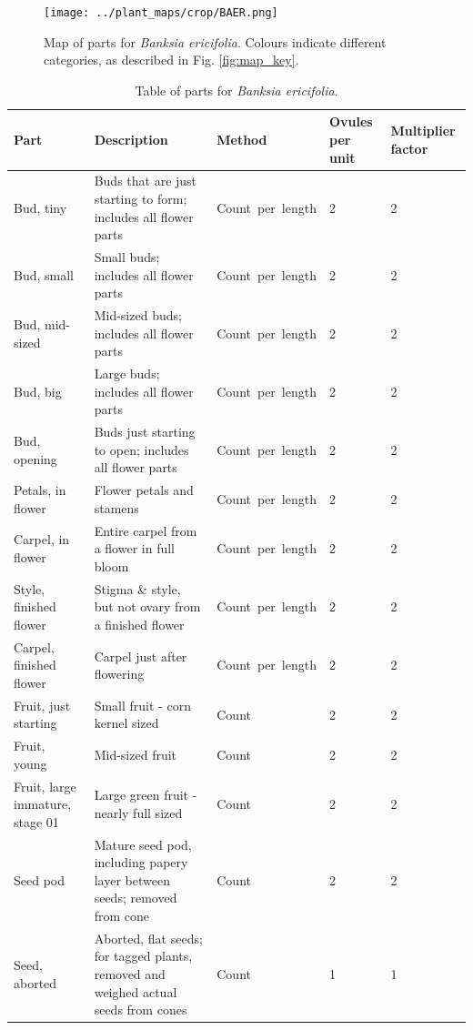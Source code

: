 \documentclass[10pt,twoside]{article}\usepackage[]{graphicx}\usepackage[]{color}
\begin{document}
\begin{figure}[h]
\centering
\texttt{[image: ../plant\_maps/crop/BAER.png]}
\caption{Map of parts for \emph{Banksia ericifolia}. Colours indicate different categories, as described in Fig. \ref{fig:map_key}.}
\label{fig:map_Banksia_ericifolia}
\end{figure}

\clearpage
\begingroup\small
\begin{longtable}{p{4.5cm}p{6cm}p{2cm}p{1cm}p{1cm}}
\caption{Table of parts for \emph{Banksia ericifolia}.} \\ 
  \hline
Part & Description & Method & Ovules per unit & Multiplier factor \\ 
  \hline
Bud, tiny & Buds that are just starting to form; includes all flower parts & Count\ per\ length & 2 &   2 \\ 
  Bud, small & Small buds; includes all flower parts & Count\ per\ length & 2 &   2 \\ 
  Bud, mid-sized & Mid-sized buds; includes all flower parts & Count\ per\ length & 2 &   2 \\ 
  Bud, big & Large buds; includes all flower parts & Count\ per\ length & 2 &   2 \\ 
  Bud, opening & Buds just starting to open; includes all flower parts & Count\ per\ length & 2 &   2 \\ 
  Petals, in flower & Flower petals and stamens & Count\ per\ length & 2 &   2 \\ 
  Carpel, in flower & Entire carpel from a flower in full bloom & Count\ per\ length & 2 &   2 \\ 
  Style, finished flower & Stigma \& style, but not ovary from a finished flower & Count\ per\ length & 2 &   2 \\ 
  Carpel, finished flower & Carpel just after flowering & Count\ per\ length & 2 &   2 \\ 
  Fruit, just starting & Small fruit - corn kernel sized & Count & 2 &   2 \\ 
  Fruit, young & Mid-sized fruit & Count & 2 &   2 \\ 
  Fruit, large immature, stage 01 & Large green fruit - nearly full sized & Count & 2 &   2 \\ 
  Seed pod & Mature seed pod, including papery layer between seeds; removed from cone & Count & 2 &   2 \\ 
  Seed, aborted & Aborted, flat seeds; for tagged plants, removed and weighed actual seeds from cones & Count & 1 &   1 \\ 

\end{longtable}
\end{document}
